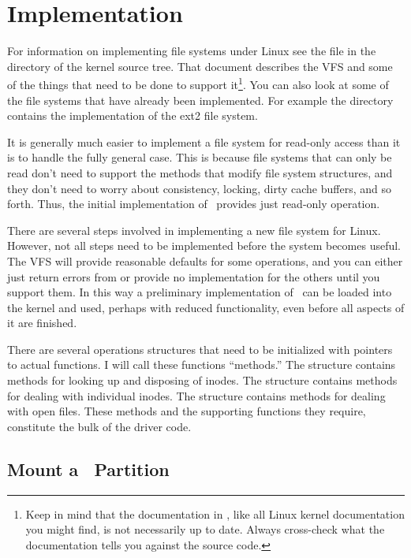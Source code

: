 
\section{Implementation}
\label{sec:implementation}

For information on implementing file systems under Linux see the file  in the
 directory of the kernel source tree. That document
describes the VFS and some of the things that need to be done to support it\footnote{Keep in
  mind that the documentation in , like all Linux kernel documentation
  you might find, is not necessarily up to date. Always cross-check what the documentation tells
  you against the source code.}. You can also look at some of the file systems that have already
been implemented. For example the directory  contains the implementation of
the ext2 file system.

It is generally much easier to implement a file system for read-only access than it is to handle
the fully general case. This is because file systems that can only be read don't need to support
the methods that modify file system structures, and they don't need to worry about consistency,
locking, dirty cache buffers, and so forth. Thus, the initial implementation of \GenericFS\
provides just read-only operation.

There are several steps involved in implementing a new file system for Linux. However, not all
steps need to be implemented before the system becomes useful. The VFS will provide reasonable
defaults for some operations, and you can either just return errors from or provide no
implementation for the others until you support them. In this way a preliminary implementation
of \GenericFS\ can be loaded into the kernel and used, perhaps with reduced functionality, even
before all aspects of it are finished.

There are several operations structures that need to be initialized with pointers to actual
functions. I will call these functions ``methods.'' The \code{super_block} structure contains
methods for looking up and disposing of inodes. The \code{inode_operations} structure contains
methods for dealing with individual inodes. The \code{file_operations} structure contains
methods for dealing with open files. These methods and the supporting functions they require,
constitute the bulk of the driver code.

\subsection{Mount a \GenericFS\ Partition}
\label{sec:implementation-mount}

